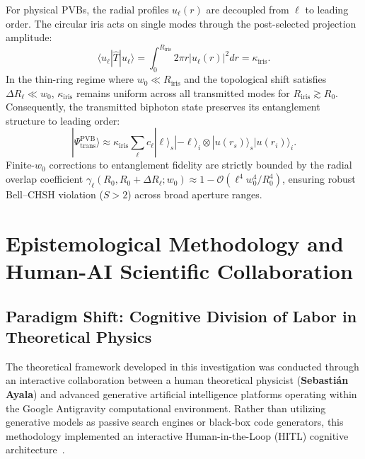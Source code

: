 \documentclass{optica-article}
\begin{document}
For physical PVBs, the radial profiles $u_\ell(r)$ are decoupled from $\ell$ to leading order. The circular iris acts on single modes through the post-selected projection amplitude:
\begin{equation}
\langle u_\ell | \hat{T} | u_\ell \rangle = \int_0^{R_{\text{iris}}} 2\pi r |u_\ell(r)|^2 dr = \kappa_{\text{iris}}.
\label{eq:pvb_pupil_scalar}
\end{equation}
In the thin-ring regime where $w_0 \ll R_{\text{iris}}$ and the topological shift satisfies $\Delta R_\ell \ll w_0$, $\kappa_{\text{iris}}$ remains uniform across all transmitted modes for $R_{\text{iris}} \gtrsim R_0$. Consequently, the transmitted biphoton state preserves its entanglement structure to leading order:
\begin{equation}
|\Psi_{\text{trans}}^{\text{PVB}}\rangle \approx \kappa_{\text{iris}} \sum_{\ell} c_\ell |\ell\rangle_s |-\ell\rangle_i \otimes |u(r_s)\rangle_s |u(r_i)\rangle_i.
\label{eq:pvb_transmitted_state}
\end{equation}
Finite-$w_0$ corrections to entanglement fidelity are strictly bounded by the radial overlap coefficient $\gamma_\ell(R_0, R_0 + \Delta R_\ell; w_0) \approx 1 - \mathcal{O}(\ell^4 w_0^4 / R_0^4)$, ensuring robust Bell--CHSH violation ($S > 2$) across broad aperture ranges.


\section{Epistemological Methodology and Human-AI Scientific Collaboration}
\label{sec:co_creation}

\subsection{Paradigm Shift: Cognitive Division of Labor in Theoretical Physics}
The theoretical framework developed in this investigation was conducted through an interactive collaboration between a human theoretical physicist (\textbf{Sebastián Ayala}) and advanced generative artificial intelligence platforms operating within the Google Antigravity computational environment. Rather than utilizing generative models as passive search engines or black-box code generators, this methodology implemented an interactive Human-in-the-Loop (HITL) cognitive architecture~\cite{VillaescusaNavarro2026,Chandra2026TheoPhysEval}.
\end{document}

